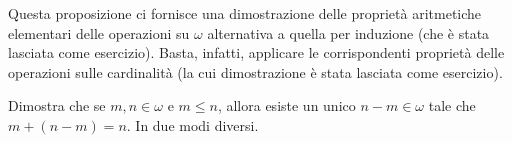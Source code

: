 \begin{note}
	Questa proposizione ci fornisce una dimostrazione delle
propriet\`a aritmetiche elementari delle operazioni su $\omega$
alternativa a quella per induzione (che \`e stata lasciata come esercizio).
	Basta, infatti, applicare le corrispondenti propriet\`a delle
operazioni sulle cardinalit\`a (la cui dimostrazione \`e stata lasciata
come esercizio).
\end{note}

\begin{exercise}
	Dimostra che se $m,n \in \omega$ e $m \leq n$, allora esiste un unico $n-m \in \omega$ tale che $m + (n-m) = n$. In due modi diversi.
\end{exercise}
